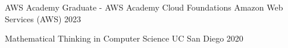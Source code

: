 

\begin{cvhonors}

  \cvhonor
    {AWS Academy Graduate - AWS Academy Cloud Foundations} %
    {Amazon Web Services (AWS)} %
    {} %
    {2023} %
  
  \cvhonor
    {Mathematical Thinking in Computer Science} %
    {UC San Diego} %
    {} %
    {2020} %
\end{cvhonors}